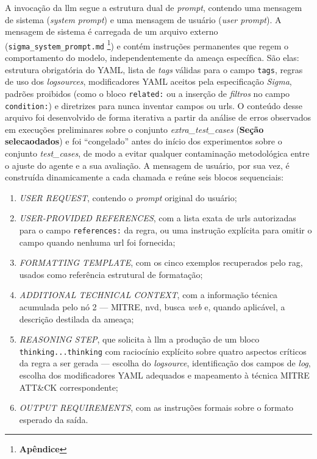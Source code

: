 A invocação da \gls{llm} segue a estrutura dual de \textit{prompt}, contendo uma mensagem de sistema (\textit{system prompt}) e uma mensagem de usuário (\textit{user prompt}). 
A mensagem de sistema é carregada de um arquivo externo (\texttt{sigma\_system\_prompt.md} \footnote{\textbf{Apêndice}}) 
e contém instruções permanentes que regem o comportamento do modelo, independentemente da ameaça específica.
São elas: estrutura obrigatória do YAML, lista de \textit{tags} válidas para o campo \texttt{tags}, regras de uso dos \textit{logsources}, modificadores YAML aceitos pela especificação \textit{Sigma}, padrões proibidos (como o bloco \texttt{related:} ou a inserção de \textit{filtros} no campo \texttt{condition:}) e diretrizes para nunca inventar campos ou \gls{url}s. 
O conteúdo desse arquivo foi desenvolvido de forma iterativa a partir da análise de erros observados em execuções preliminares sobre o conjunto \textit{extra\_test\_cases} (\textbf{Seção selecaodados}) e foi ``congelado'' antes do início dos experimentos sobre o conjunto \textit{test\_cases}, de modo a evitar qualquer contaminação metodológica entre o ajuste do agente e a sua avaliação.
A mensagem de usuário, por sua vez, é construída dinamicamente a cada chamada e reúne seis blocos sequenciais:
\begin{enumerate}
	\item \textit{USER REQUEST}, contendo o \textit{prompt} original do
	usuário;
	
	\item \textit{USER-PROVIDED REFERENCES}, com a lista exata de \gls{url}s autorizadas para o campo \texttt{references:} da regra, ou uma instrução explícita para omitir o campo quando nenhuma \gls{url} foi fornecida;
	
	\item \textit{FORMATTING TEMPLATE}, com os cinco exemplos recuperados pelo \gls{rag}, usados como referência estrutural de formatação;
	
	\item \textit{ADDITIONAL TECHNICAL CONTEXT}, com a informação técnica acumulada pelo nó 2 --- MITRE, \gls{nvd}, busca \textit{web} e, quando aplicável, a descrição destilada da ameaça;
	
	\item \textit{REASONING STEP}, que solicita à \gls{llm} a produção de um bloco \texttt{\<thinking\>...\<\/thinking\>} com raciocínio explícito sobre quatro aspectos críticos da regra a ser gerada --- escolha do \textit{logsource}, identificação dos campos de \textit{log}, escolha dos modificadores YAML adequados e mapeamento à técnica MITRE ATT\&CK correspondente;
	
	\item \textit{OUTPUT REQUIREMENTS}, com as instruções formais sobre o formato esperado da saída.
\end{enumerate}

